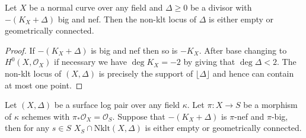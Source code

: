\documentclass[a4paper,12pt]{book}
\newcommand{\D}{\Delta}
\newcommand{\nklt}{\text{Nklt}}
\newcommand{\ox}{\mathcal{O}_{X}}
\begin{document}
\begin{lemma}
	Let $X$ be a normal curve over any field and $\Delta \geq 0 $ be a divisor with $-(K_{X}+\Delta)$ big and nef. Then the non-klt locus of $\Delta$ is either empty or geometrically connected. 
\end{lemma}

\begin{proof}
	If $-(K_{X}+\Delta)$ is big and nef then so is $-K_{X}$. After base changing to $H^{0}(X,\ox)$ if necessary we have $\deg K_{X} = -2$ by \cite[Corollary 2.8]{tanaka2018minimal} giving that $ \deg \Delta <2$. The non-klt locus of $(X,\Delta)$ is precisely the support of $\lfloor \D \rfloor$ and hence can contain at most one point.
\end{proof}

\begin{theorem}\cite[Theorem 5.2]{tanaka2018minimal}\label{Tcl}
	Let $(X,\Delta)$ be a surface log pair over any field $\kappa$. Let $\pi\colon X \to S$ be a morphism of $\kappa$ schemes with $\pi_{*}\ox =\mathcal{O}_{S}$. Suppose that $-(K_{X}+\Delta)$ is $\pi$-nef and $\pi$-big, then for any $s \in S$ $X_{S}\cap \nklt(X,\Delta)$ is either empty or geometrically connected. 
\end{theorem}
\end{document}
